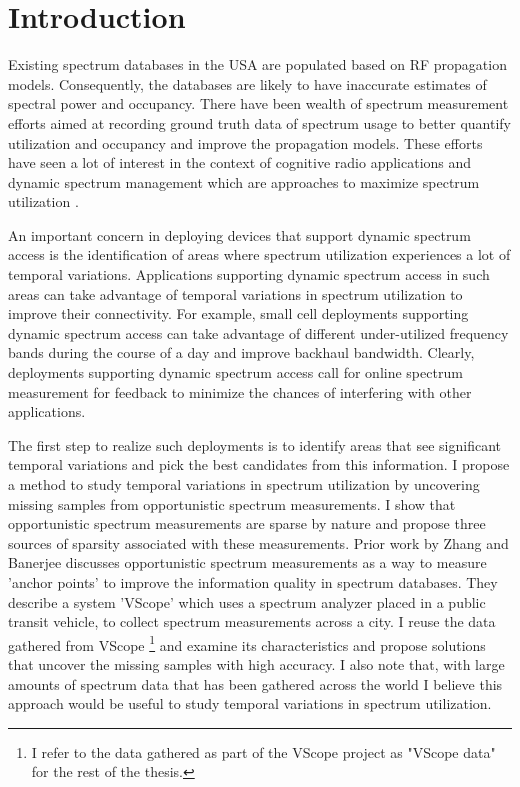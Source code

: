 
\section{Introduction}

Existing spectrum databases \cite{GoogleSpectrumDatabase} \cite{SpectrumBridge} \cite{MicrosoftWhitespaces} in the USA are populated based on RF propagation models.
 Consequently, the databases are likely to have inaccurate estimates of spectral power and occupancy.
 There have been wealth of spectrum measurement efforts aimed at recording ground truth data of spectrum usage to better quantify utilization and occupancy and improve the propagation models.
 These efforts have seen a lot of interest in the context of cognitive radio applications and dynamic spectrum management which are approaches to maximize spectrum utilization \cite{SpectrumForCogRadio1} \cite{ChicagoSpectrum} \cite{ChicagoSpectrum2} \cite{SpectrumDynamics}.


An important concern in deploying devices that support dynamic spectrum access is the identification of areas where spectrum utilization experiences a lot of temporal variations.
 Applications supporting dynamic spectrum access in such areas can take advantage of temporal variations in spectrum utilization to improve their connectivity.
 For example, small cell deployments supporting dynamic spectrum access can take advantage of different under-utilized frequency bands during the course of a day and improve backhaul bandwidth.
 Clearly, deployments supporting dynamic spectrum access call for online spectrum measurement for feedback to minimize the chances of interfering with other applications.

The first step to realize such deployments is to identify areas that see significant temporal variations and pick the best candidates from this information.
 I propose a method to study temporal variations in spectrum utilization by uncovering missing samples from opportunistic spectrum measurements.
 I show that opportunistic spectrum measurements are sparse by nature and propose three sources of sparsity associated with these measurements.
 Prior work by Zhang and Banerjee \cite{VScope} \cite{VScope2} discusses opportunistic spectrum measurements as a way to measure 'anchor points' to improve the information quality in spectrum databases.
 They describe a system 'VScope' which uses a spectrum analyzer placed in a public transit vehicle, to collect spectrum measurements across a city.
 I reuse the data gathered from VScope \footnote{I refer to the data gathered as part of the VScope \cite{VScope} project as "VScope data" for the rest of the thesis.} and examine its characteristics and propose solutions that uncover the missing samples with high accuracy.
 I also note that, with large amounts of spectrum data that has been gathered across the world \cite{petrin2004measurement} \cite{ChicagoSpectrum} \cite{ChicagoSpectrum2} \cite{SpectrumDynamics} \cite{GoogleSpectrumDatabase} \cite{MicrosoftWhitespaces} \cite{SpectrumIndia} \cite{SpectrumDataMining} I believe this approach would be useful to study temporal variations in spectrum utilization.

